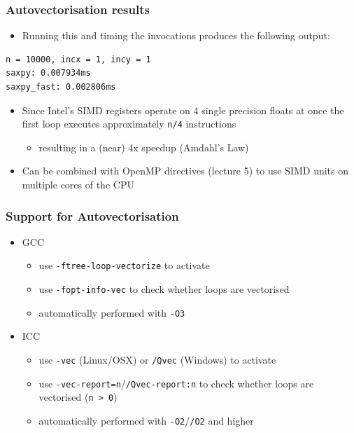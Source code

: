 \subsubsection{Autovectorisation
results}\label{autovectorisation-results}

\begin{itemize}
\itemsep1pt\parskip0pt
\item
  Running this and timing the invocations produces the following output:
\end{itemize}

\begin{verbatim}
n = 10000, incx = 1, incy = 1
saxpy: 0.007934ms
saxpy_fast: 0.002806ms
\end{verbatim}

\begin{itemize}
\itemsep1pt\parskip0pt
\item
  Since Intel's SIMD registers operate on 4 single precision floats at
  once the first loop executes approximately \texttt{n/4} instructions

  \begin{itemize}
  \itemsep1pt\parskip0pt
  \item
    resulting in a (near) 4x speedup (Amdahl's Law)
  \end{itemize}
\item
  Can be combined with OpenMP directives (lecture 5) to use SIMD units
  on multiple cores of the CPU
\end{itemize}

\subsubsection{Support for
Autovectorisation}\label{support-for-autovectorisation}

\begin{itemize}
\itemsep1pt\parskip0pt
\item
  GCC

  \begin{itemize}
  \itemsep1pt\parskip0pt
  \item
    use \texttt{-ftree-loop-vectorize} to activate
  \item
    use \texttt{-fopt-info-vec} to check whether loops are vectorised
  \item
    automatically performed with \texttt{-O3}
  \end{itemize}
\item
  ICC

  \begin{itemize}
  \itemsep1pt\parskip0pt
  \item
    use \texttt{-vec} (Linux/OSX) or \texttt{/Qvec} (Windows) to
    activate
  \item
    use \texttt{-vec-report=n}/\texttt{/Qvec-report:n} to check whether
    loops are vectorised (\texttt{n \textgreater{} 0})
  \item
    automatically performed with \texttt{-O2}/\texttt{/O2} and higher
  \end{itemize}
\end{itemize}

